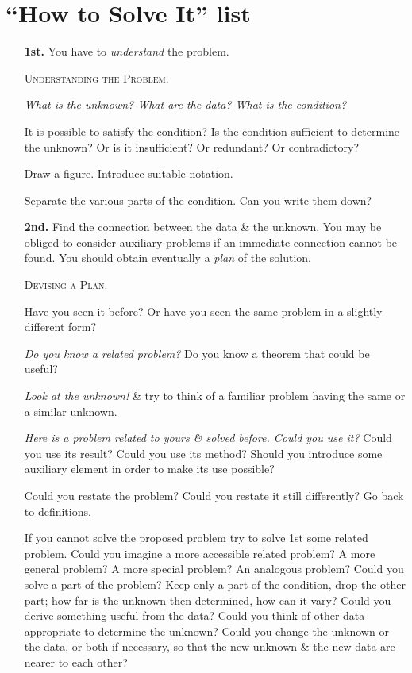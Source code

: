 \documentclass[oneside]{book}
\numberwithin{equation}{section}
\begin{document}
\section*{``How to Solve It'' list}
\begin{itemize}
	\item[\textbf{1st.}] You have to \textit{understand} the problem.
	
	\textsc{Understanding the Problem.}
	
	\textit{What is the unknown? What are the data? What is the condition?}
	
	It is possible to satisfy the condition? Is the condition sufficient to determine the unknown? Or is it insufficient? Or redundant? Or contradictory?
	
	Draw a figure. Introduce suitable notation.
	
	Separate the various parts of the condition. Can you write them down?
	\item[\textbf{2nd.}] Find the connection between the data \& the unknown. You may be obliged to consider auxiliary problems if an immediate connection cannot be found. You should obtain eventually a \textit{plan} of the solution.
	
	\textsc{Devising a Plan.}
	
	Have you seen it before? Or have you seen the same problem in a slightly different form?
	
	\textit{Do you know a related problem?} Do you know a theorem that could be useful?
	
	\textit{Look at the unknown!} \& try to think of a familiar problem having the same or a similar unknown.
	
	\textit{Here is a problem related to yours \& solved before. Could you use it?} Could you use its result? Could you use its method? Should you introduce some auxiliary element in order to make its use possible?
	
	Could you restate the problem? Could you restate it still differently? Go back to definitions.
	
	If you cannot solve the proposed problem try to solve 1st some related problem. Could you imagine a more accessible related problem? A more general problem? A more special problem? An analogous problem? Could you solve a part of the problem? Keep only a part of the condition, drop the other part; how far is the unknown then determined, how can it vary? Could you derive something useful from the data? Could you think of other data appropriate to determine the unknown? Could you change the unknown or the data, or both if necessary, so that the new unknown \& the new data are nearer to each other?
	

\end{itemize}
\end{document}
